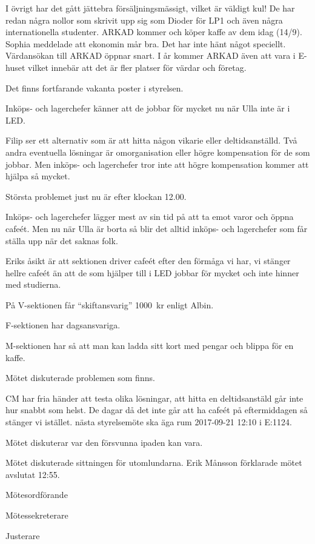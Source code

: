 \documentclass[10pt]{article}
\def\mo{Erik Månsson}
\def\ms{Johan Karlberg}
\def\ji{Josefine Sandström}
\begin{document}
\begin{paragrafer}
\begin{paragrafer}
I övrigt har det gått jättebra försäljningsmässigt, vilket är väldigt kul! De har redan några nollor som skrivit upp sig som Dioder för LP1 och även några internationella studenter. ARKAD kommer och köper kaffe av dem idag (14/9).
Sophia meddelade att ekonomin mår bra. Det har inte hänt något speciellt.
Värdansökan till ARKAD öppnar snart. I år kommer ARKAD även att vara i E-huset vilket innebär att det är fler platser för värdar och företag.

Det finns fortfarande vakanta poster i styrelsen.
\end{paragrafer}

Inköps- och lagerchefer känner att de jobbar för mycket nu när Ulla inte är i LED.

Filip ser ett alternativ som är att hitta någon vikarie eller deltidsanställd.
Två andra eventuella lösningar är omorganisation eller högre kompensation för de som jobbar. Men inköps- och lagerchefer tror inte att högre kompensation kommer att hjälpa så mycket.

Största problemet just nu är efter klockan 12.00.

Inköps- och lagerchefer lägger mest av sin tid på att ta emot varor och öppna cafeét. Men nu när Ulla är borta så blir det alltid inköps- och lagerchefer som får ställa upp när det saknas folk.

Eriks åsikt är att sektionen driver cafeét efter den förmåga vi har, vi stänger hellre cafeét än att de som hjälper till i LED jobbar för mycket och inte hinner med studierna.

På V-sektionen får ``skiftansvarig'' \SI{1000}{kr} enligt Albin.

F-sektionen har dagsansvariga.

M-sektionen har så att man kan ladda sitt kort med pengar och blippa för en kaffe.

Mötet diskuterade problemen som finns.

CM har fria händer att testa olika lösningar, att hitta en deltidsanstäld går inte hur snabbt som helst. De dagar då det inte går att ha cafeét på eftermiddagen så stänger vi istället.
{\Mba}nästa styrelsemöte ska äga rum 2017-09-21 12:10 i E:1124.

{\Ibfu}

Mötet diskuterar var den försvunna ipaden kan vara.

Mötet diskuterade sittningen för utomlundarna.
{\mo} förklarade mötet avslutat 12:55.

\end{paragrafer}

\hidesignfoot
\begin{signatures}{3}
\signature{\mo}{Mötesordförande}
\signature{\ms}{Mötessekreterare}
\signature{\ji}{Justerare}
\end{signatures}
\end{document}
